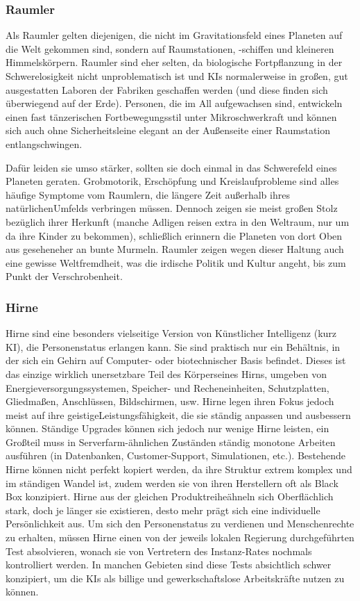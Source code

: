 \subsubsection{Raumler}
Als Raumler gelten diejenigen, die nicht im Gravitationsfeld eines Planeten auf die Welt gekommen sind, sondern auf Raumstationen, -schiffen und kleineren Himmelskörpern. Raumler sind eher selten, da biologische Fortpflanzung in der Schwerelosigkeit nicht unproblematisch ist und KIs normalerweise in großen, gut ausgestatten Laboren der Fabriken geschaffen werden (und diese finden sich überwiegend auf der Erde). Personen, die im All aufgewachsen sind, entwickeln einen fast tänzerischen Fortbewegungsstil unter Mikroschwerkraft und können sich auch ohne Sicherheitsleine elegant an der Außenseite einer Raumstation entlangschwingen.

Dafür leiden sie umso stärker, sollten sie doch einmal in das Schwerefeld eines Planeten geraten. Grobmotorik, Erschöpfung und Kreislaufprobleme sind alles häufige Symptome vom Raumlern, die längere Zeit außerhalb ihres \glqq natürlichen\grqq  Umfelds verbringen müssen. Dennoch zeigen sie meist großen Stolz bezüglich ihrer Herkunft (manche Adligen reisen extra in den Weltraum, nur um da ihre Kinder zu bekommen), schließlich erinnern die Planeten \glqq von dort Oben aus gesehen\grqq eher an bunte Murmeln. Raumler zeigen wegen dieser Haltung auch eine gewisse Weltfremdheit, was die irdische Politik und Kultur angeht, bis zum Punkt der Verschrobenheit.
\subsubsection{Hirne}
Hirne sind eine besonders vielseitige Version von Künstlicher Intelligenz (kurz KI), die Personenstatus erlangen kann. Sie sind praktisch nur ein Behältnis, in der sich ein Gehirn auf Computer- oder biotechnischer Basis befindet. Dieses ist das einzige wirklich unersetzbare Teil des \glqq Körpers\grqq  eines Hirns, umgeben von  Energieversorgungssystemen, Speicher- und Recheneinheiten, Schutzplatten, Gliedmaßen, Anschlüssen, Bildschirmen, usw. Hirne legen ihren Fokus jedoch meist auf ihre \glqq geistige\grqq  Leistungsfähigkeit, die sie ständig anpassen und ausbessern können. Ständige Upgrades können sich jedoch nur wenige Hirne leisten, ein Großteil muss in Serverfarm-ähnlichen Zuständen ständig monotone Arbeiten ausführen (in Datenbanken, Customer-Support, Simulationen, etc.).
Bestehende Hirne können nicht perfekt kopiert werden, da ihre Struktur extrem komplex und im ständigen Wandel ist, zudem werden sie von ihren Herstellern oft als Black Box konzipiert. Hirne aus der gleichen \glqq Produktreihe\grqq ähneln sich Oberflächlich stark, doch je länger sie existieren, desto mehr prägt sich eine individuelle Persönlichkeit aus. Um sich den Personenstatus zu verdienen und Menschenrechte zu erhalten, müssen Hirne einen von der jeweils lokalen Regierung durchgeführten Test absolvieren, wonach sie von Vertretern des Instanz-Rates nochmals kontrolliert werden. In manchen Gebieten sind diese Tests absichtlich schwer konzipiert, um die KIs als billige und gewerkschaftslose Arbeitskräfte nutzen zu können.
